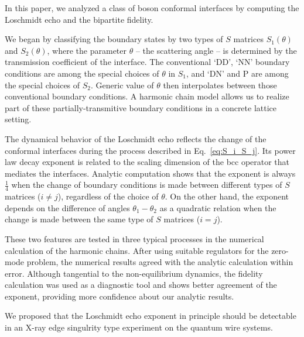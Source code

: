 
In this paper, we analyzed a class of boson conformal interfaces by computing the Loschmidt echo and the bipartite fidelity. 

We began by classifying the boundary states by two types of $S$ matrices $S_1(\theta)$ and $S_2(\theta)$, where the parameter $\theta$ -- the scattering angle -- is determined by the transmission coefficient of the interface. The conventional `DD', `NN' boundary conditions are among the special choices of $\theta$ in $S_1$, and `DN' and P are among the special choices of $S_2$. Generic value of $\theta$ then interpolates between those conventional boundary conditions. A harmonic chain model allows us to realize part of these partially-transmitive boundary conditions in a concrete lattice setting. 

The dynamical behavior of the Loschmidt echo reflects the change of the conformal interfaces during the process described in Eq.~\eqref{eq:S_i_S_j}.
Its power law decay exponent is related to the scaling dimension of the bcc operator that mediates the interfaces. Analytic computation shows that the exponent is always $\frac{1}{4}$ when the change of boundary conditions is made between different types of $S$ matrices ($i \ne j$), regardless of the choice of $\theta$. On the other hand, the exponent depends on the difference of angles $\theta_1 - \theta_2$ as a quadratic relation when the change is made between the same type of $S$ matrices ($i = j$).

These two features are tested in three typical processes in the numerical calculation of the harmonic chains. After using suitable regulators for the zero-mode problem, the numerical results agreed with the analytic calculation within error. Although tangential to the non-equilibrium dynamics, the fidelity calculation was used as a diagnostic tool and shows better agreement of the exponent, providing more confidence about our analytic results. 

We proposed that the Loschmidt echo exponent in principle should be detectable in an X-ray edge singulrity type experiment on the quantum wire systems. 

